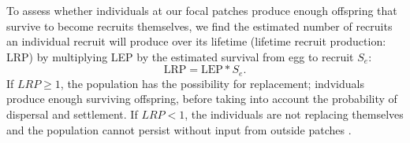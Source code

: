 \documentclass[12pt, oneside]{article}   	%
\begin{document}



To assess whether individuals at our focal patches produce enough offspring that survive to become recruits themselves, we find the estimated number of recruits an individual recruit will produce over its lifetime (lifetime recruit production: LRP) by multiplying LEP by the estimated survival from egg to recruit $S_e$:
\begin{equation}
\text{LRP} = \text{LEP} * S_e. \label{EQN_LRP}
\end{equation}
If $LRP \geq 1$, the population has the possibility for replacement; indviduals produce enough surviving offspring, before taking into account the probability of dispersal and settlement. If $LRP < 1$, the individuals are not replacing themselves and the population cannot persist without input from outside patches .%
\end{document}
